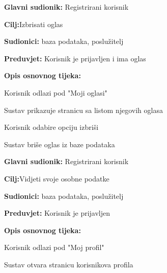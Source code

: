 \noindent {}
\begin{packed_item}
	
	\item \textbf{Glavni sudionik: }Registrirani korisnik
	\item  \textbf{Cilj:}Izbrisati oglas
	\item  \textbf{Sudionici:} baza podataka, poslužitelj
	\item  \textbf{Preduvjet:} Korisnik je prijavljen i ima oglas
	\item  \textbf{Opis osnovnog tijeka:}
	
	\item[] \begin{packed_enum}
		
		\item Korisnik odlazi pod "Moji oglasi" 
		\item Sustav prikazuje stranicu sa listom njegovih oglasa
		\item Korisnik odabire opciju izbriši
		\item Sustav briše oglas iz baze podataka
		
	\end{packed_enum}
\end{packed_item}

\noindent {}
\begin{packed_item}
	
	\item \textbf{Glavni sudionik: }Registrirani korisnik
	\item  \textbf{Cilj:}Vidjeti svoje osobne podatke
	\item  \textbf{Sudionici:} baza podataka, poslužitelj
	\item  \textbf{Preduvjet:} Korisnik je prijavljen
	\item  \textbf{Opis osnovnog tijeka:}
	
	\item[] \begin{packed_enum}
		
		\item Korisnik odlazi pod "Moj profil"
		\item Sustav otvara stranicu korisnikova profila 
		
	\end{packed_enum}
\end{packed_item}

